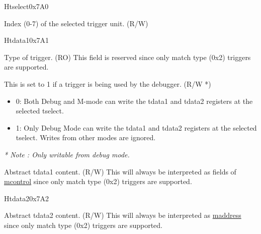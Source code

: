 
\begin{register}{H}{tselect}{0x7A0}\label{regdesc:TSELECT}
%
%
\regnewline%
\begin{regdesc}\begin{reglist}
\label{fielddesc:TSELECT}\item [tselect] Index (0-7) of the selected trigger unit. (R/W)
\end{reglist}\end{regdesc}
\end{register}

\begin{register}{H}{tdata1}{0x7A1}\label{regdesc:TDATA1}
%
%
%
\regnewline%
\begin{regdesc}\begin{reglist}
\label{fielddesc:TDATA1TYPE}\item [type] Type of trigger. (RO) \newline This field is reserved since only match type (0x2) triggers are supported.
\label{fielddesc:TDATA1DMODE}\item [dmode] This is set to 1 if a trigger is being used by the debugger. (R/W *)
\begin{itemize}
    \setlength\itemsep{-1em}
    \item 0: Both Debug and M-mode can write the tdata1 and tdata2
registers at the selected tselect.
    \item 1: Only Debug Mode can write the tdata1 and tdata2 registers at the selected tselect. Writes from other modes are ignored.
\end{itemize}
\textit{* Note : Only writable from debug mode.}
\label{fielddesc:TDATA1DATA}\item [data] Abstract tdata1 content. (R/W) \newline This will always be interpreted as fields of \hyperref[regdesc:MCONTROL]{mcontrol} since only match type (0x2) triggers are supported.
\end{reglist}\end{regdesc}
\end{register}

\begin{register}{H}{tdata2}{0x7A2}\label{regdesc:TDATA2}
%
\regnewline%
\begin{regdesc}\begin{reglist}
\label{fielddesc:TDATA2}\item [tdata2] Abstract tdata2 content. (R/W) \newline This will always be interpreted as \hyperref[regdesc:MADDRESS]{maddress} since only match type (0x2) triggers are supported.
\end{reglist}\end{regdesc}
\end{register}

